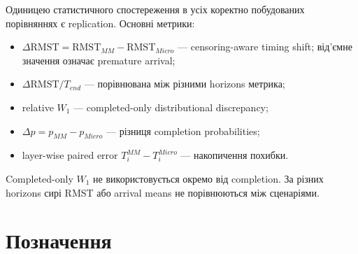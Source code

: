 \documentclass[11pt,a4paper]{article}
\begin{document}
Одиницею статистичного спостереження в усіх коректно побудованих порівняннях
є replication. Основні метрики:
\begin{itemize}
 \item $\Delta\mathrm{RMST}=\mathrm{RMST}_{MM}-\mathrm{RMST}_{Micro}$ ---
 censoring-aware timing shift; від'ємне значення означає premature arrival;
 \item $\Delta\mathrm{RMST}/T_{end}$ --- порівнювана між різними horizons метрика;
 \item relative $W_1$ --- completed-only distributional discrepancy;
 \item $\Delta p=p_{MM}-p_{Micro}$ --- різниця completion probabilities;
 \item layer-wise paired error $T_i^{MM}-T_i^{Micro}$ --- накопичення похибки.
\end{itemize}

Completed-only $W_1$ не використовується окремо від completion. За різних
horizons сирі RMST або arrival means не порівнюються між сценаріями.

\section{Позначення}
\end{document}
